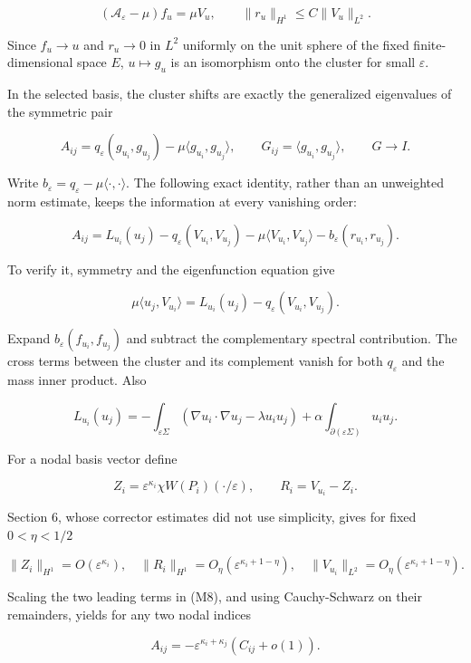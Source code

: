 \documentclass[11pt]{article}
\begin{document}
\[
 (\mathcal A_\varepsilon-\mu)f_u=\mu V_u,
 \qquad \|r_u\|_{H^1}\le C\|V_u\|_{L^2}.
 \tag{M6}
\]

Since \(f_u\to u\) and \(r_u\to0\) in \(L^2\) uniformly on the unit
sphere of the fixed finite-dimensional space \(E\), \(u\mapsto g_u\) is
an isomorphism onto the cluster for small \(\varepsilon\).

In the selected basis, the cluster shifts are exactly the generalized
eigenvalues of the symmetric pair

\[
 A_{ij}=q_\varepsilon(g_{u_i},g_{u_j})-\mu\langle g_{u_i},g_{u_j}\rangle,
 \qquad G_{ij}=\langle g_{u_i},g_{u_j}\rangle,
 \qquad G\longrightarrow I.
 \tag{M7}
\]

Write \(b_\varepsilon=q_\varepsilon-\mu\langle\cdot,\cdot\rangle\). The
following exact identity, rather than an unweighted norm estimate, keeps
the information at every vanishing order:

\[
 A_{ij}=L_{u_i}(u_j)-q_\varepsilon(V_{u_i},V_{u_j})
       -\mu\langle V_{u_i},V_{u_j}\rangle
       -b_\varepsilon(r_{u_i},r_{u_j}).
 \tag{M8}
\]

To verify it, symmetry and the eigenfunction equation give

\[
 \mu\langle u_j,V_{u_i}\rangle
 =L_{u_i}(u_j)-q_\varepsilon(V_{u_i},V_{u_j}).
\]

Expand \(b_\varepsilon(f_{u_i},f_{u_j})\) and subtract the complementary
spectral contribution. The cross terms between the cluster and its
complement vanish for both \(q_\varepsilon\) and the mass inner product.
Also

\[
 L_{u_i}(u_j)
 =-\int_{\varepsilon\Sigma}
       (\nabla u_i\cdot\nabla u_j-\lambda u_i u_j)
      +\alpha\int_{\partial(\varepsilon\Sigma)}u_i u_j.
 \tag{M9}
\]

For a nodal basis vector define

\[
 Z_i=\varepsilon^{\kappa_i}\chi W(P_i)(\cdot/\varepsilon),
 \qquad R_i=V_{u_i}-Z_i.
\]

Section 6, whose corrector estimates did not use simplicity, gives for
fixed \(0<\eta<1/2\)

\[
 \|Z_i\|_{H^1}=O(\varepsilon^{\kappa_i}),\quad
 \|R_i\|_{H^1}=O_\eta(\varepsilon^{\kappa_i+1-\eta}),\quad
 \|V_{u_i}\|_{L^2}=O_\eta(\varepsilon^{\kappa_i+1-\eta}).
 \tag{M10}
\]

Scaling the two leading terms in (M8), and using Cauchy-Schwarz on their
remainders, yields for any two nodal indices

\[
 A_{ij}=-\varepsilon^{\kappa_i+\kappa_j}
             (C_{ij}+o(1)).
 \tag{M11}
\]
\end{document}
